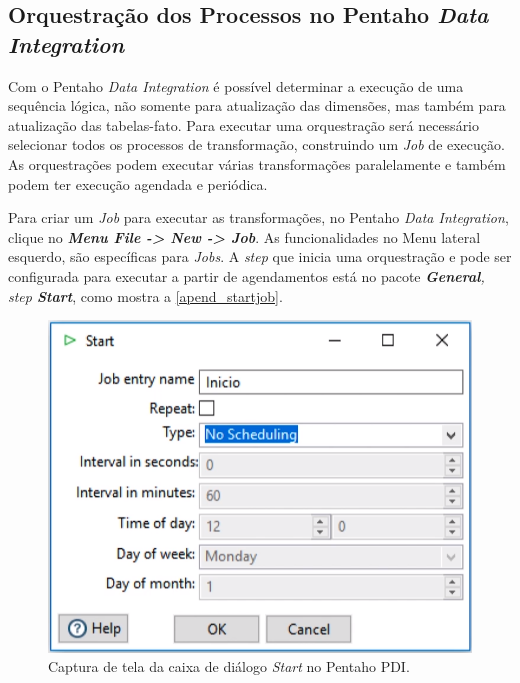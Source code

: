 \begin{apendicesenv}
\chapter{Orquestração dos Processos no Pentaho \textit{Data Integration}}

Com o Pentaho \textit{Data Integration} é possível determinar a execução de uma sequência lógica, não somente para atualização das dimensões, mas também para atualização das tabelas-fato. Para executar uma orquestração será necessário selecionar todos os processos de transformação, construindo um \textit{Job} de execução. As orquestrações podem executar várias transformações paralelamente e também podem ter execução agendada e periódica.

Para criar um \textit{Job} para executar as transformações, no Pentaho \textit{Data Integration}, clique no \textbf{\textit{Menu File -> New -> Job}}. As funcionalidades no Menu lateral esquerdo, são específicas para \textit{Jobs}. A \textit{step} que inicia uma orquestração e pode ser configurada para executar a partir de agendamentos está no pacote \textit{\textbf{General}, step \textbf{Start}}, como mostra a \autoref{apend_startjob}.

\begin{figure}[htb]
	\caption{\label{apend_startjob}Captura de tela da caixa de diálogo \textit{Start} no Pentaho PDI.}
	\begin{center}
	    \includegraphics[scale=0.5]{Imagens/apendice startjobs shedule.png}
	\end{center}
\end{figure}


\end{apendicesenv}
